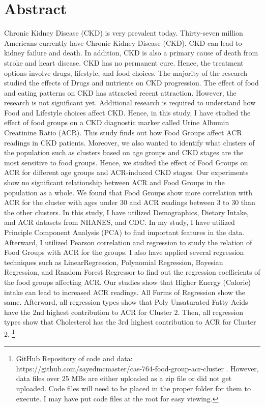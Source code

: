 \section{Abstract}

\flushleft \justifying Chronic Kidney Disease (CKD) is very prevalent today. Thirty-seven million Americans currently have Chronic Kidney Disease (CKD). CKD can lead to kidney failure and death. In addition, CKD is also a primary cause of death from stroke and heart disease. CKD has no permanent cure. Hence, the treatment options involve drugs, lifestyle, and food choices. The majority of the research studied the effects of Drugs and nutrients on CKD progression. The effect of food and eating patterns on CKD has attracted recent attraction. However, the research is not significant yet. Additional research is required to understand how Food and Lifestyle choices affect CKD. Hence, in this study, I have studied the effect of food groups on a CKD diagnostic marker called Urine Albumin Creatinine Ratio (ACR). This study finds out how Food Groups affect ACR readings in CKD patients. Moreover, we also wanted to identify what clusters of the population such as clusters based on age groups and CKD stages are the most sensitive to food groups. Hence, we studied the effect of Food Groups on ACR for different age groups and ACR-induced CKD stages. Our experiments show no significant relationship between ACR and Food Groups in the population as a whole. We found that Food Groups show more correlation with ACR for the cluster with ages under 30 and ACR readings between 3 to 30 than the other clusters. In this study, I have utilized Demographics, Dietary Intake, and ACR datasets from NHANES, and CDC. In my study, I have utilized Principle Component Analysis (PCA) to find important features in the data. Afterward, I utilized Pearson correlation and regression to study the relation of Food Groups with ACR for the groups. I also have applied several regression techniques such as LinearRegression, Polynomial Regression, Bayesian Regression, and Random Forest Regressor to find out the regression coefficients of the food groups affecting ACR. Our studies show that Higher Energy (Calorie) intake can lead to increased ACR readings. All Forms of Regression show the same. Afterward, all regression types show that Poly Unsaturated Fatty Acids have the 2nd highest contribution to ACR for Cluster 2. Then, all regression types show that Cholesterol has the 3rd highest contribution to ACR for Cluster 2. \footnote{GitHub Repository of code and data: https://github.com/sayedmcmaster/cas-764-food-group-acr-cluster . However, data files over 25 MBs are either uploaded as a zip file or did not get uploaded. Code files will need to be placed in the proper folder for them to execute. I may have put code files at the root for easy viewing.}

